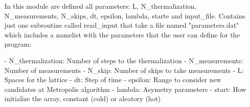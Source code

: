 In this module are defined all parameters: L, N_thermalization, N_measurements, N_skips, dt, epsilon, lambda, starte and input_file. Contains just one subroutine called read_input that take a file named "parameters.dat" which includes a namelist with the parameters that the user can define for the program:

- N_thermalization: Number of steps to the thermalization
- N_measurements: Number of measurements
- N_skip: Number of skips to take measurements
- L: Spaces for the lattice
- dt: Step of time
- epsilon: Range to consider new candidates at Metropolis algorithm
- lambda: Asymetry parameters
- start: How initialize the array, constant (cold) or aleatory (hot)
